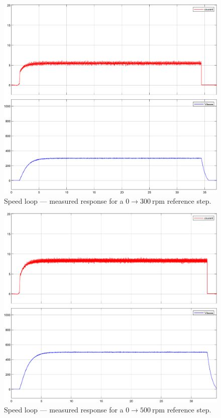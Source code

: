 \documentclass{rapportCS}
\begin{document}
\begin{figure}[H]
    \centering
    \includegraphics[width=\linewidth, keepaspectratio]{figures/p300.png}
    \caption{Speed loop --- measured response for a $0 \rightarrow 300~\text{rpm}$ reference step.}
    \label{fig:exp_W_300}
\end{figure}

\begin{figure}[H]
    \centering
    \includegraphics[width=\linewidth, keepaspectratio]{figures/p500.png}
    \caption{Speed loop --- measured response for a $0 \rightarrow 500~\text{rpm}$ reference step.}
    \label{fig:exp_W_500}
\end{figure}
\end{document}
